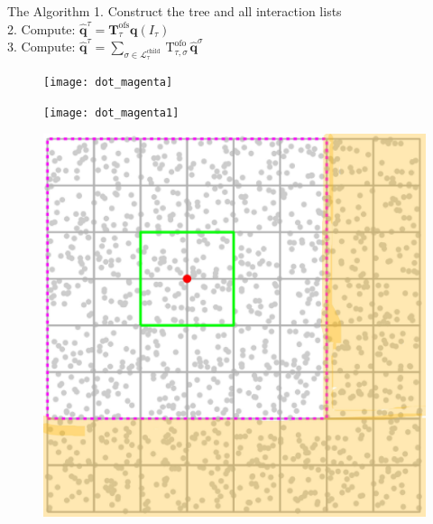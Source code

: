  \begin{frame}{The Algorithm}
  1. Construct the tree and all interaction lists\\
  \vspace{3mm}
  2. Compute: $\hat{\mathbf{q}}^{\tau}=\mathbf{T}_{\tau}^{\mathrm{ofs}} \mathbf{q}\left(I_{\tau}\right)$\\
  \vspace{3mm}
  3. Compute: $\hat{\mathbf{q}}^{\tau}=\sum_{\sigma \in \mathcal{L}_{\tau}^{\text {child }}} \mathrm{T}_{\tau, \sigma}^{\text {ofo }} \hat{\mathbf{q}}^{\sigma}$\\

  \vspace{6mm}
  \begin{figure}[!tbp]
    \centering
    \begin{minipage}[b]{0.3\textwidth}
      \texttt{[image: dot\_magenta]}
    \end{minipage}
    \hfill
    \begin{minipage}[b]{0.3\textwidth}
      \texttt{[image: dot\_magenta1]}
    \end{minipage}
    \hfill
    \begin{minipage}[b]{0.3\textwidth}
      \includegraphics[width=\textwidth]{presentation/img/magenta_yellow1.jpg}
    \end{minipage}
  \end{figure}

\end{frame}

